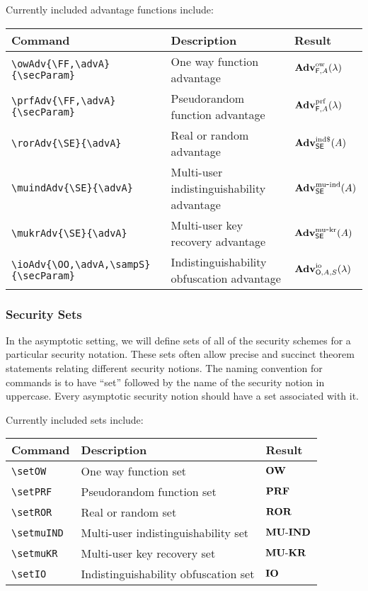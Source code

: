 \documentclass[11pt,twoside]{report}
\begin{document}
Currently included advantage functions include:
\begin{center}
\begin{tabular}{l l l}
	\textbf{Command} & \textbf{Description} & \textbf{Result} \\\hline
	\lstinline$\owAdv{\FF,\advA}{\secParam}$ & One way function advantage & $\mathbf{Adv}^{\rm ow}_{\mathsf{F},A}(\lambda)$  \\
	\lstinline$\prfAdv{\FF,\advA}{\secParam}$ & Pseudorandom function advantage & $\mathbf{Adv}^{\rm prf}_{\mathsf{F},A}(\lambda)$  \\
	\lstinline$\rorAdv{\SE}{\advA}$ & Real or random advantage & $\mathbf{Adv}^{\rm ind\$}_{\mathsf{SE}}(A)$  \\
	\lstinline$\muindAdv{\SE}{\advA}$ & Multi-user indistinguishability advantage & $\mathbf{Adv}^{\rm mu\mbox{-}ind}_{\mathsf{SE}}(A)$  \\
	\lstinline$\mukrAdv{\SE}{\advA}$ & Multi-user key recovery advantage & $\mathbf{Adv}^{\rm mu\mbox{-}kr}_{\mathsf{SE}}(A)$  \\
	\lstinline$\ioAdv{\OO,\advA,\sampS}{\secParam}$ & Indistinguishability obfuscation advantage & $\mathbf{Adv}^{\rm io}_{\mathsf{O},A,S}(\lambda)$
\end{tabular}
\end{center}

\subsubsection{Security Sets}
In the asymptotic setting, we will define sets of all of the security schemes for a particular security notation.
These sets often allow precise and succinct theorem statements relating different security notions.
The naming convention for commands is to have ``set'' followed by the name of the security notion in uppercase.
Every asymptotic security notion should have a set associated with it.

Currently included sets include:
\begin{center}
\begin{tabular}{l l l}
	\textbf{Command} & \textbf{Description} & \textbf{Result} \\\hline
	\lstinline$\setOW$ & One way function set & $\mathbf{OW}$  \\
	\lstinline$\setPRF$ & Pseudorandom function set & $\mathbf{PRF}$  \\
	\lstinline$\setROR$ & Real or random set & $\mathbf{ROR}$  \\
	\lstinline$\setmuIND$ & Multi-user indistinguishability set & $\mathbf{MU\mbox{-}IND}$  \\
	\lstinline$\setmuKR$ & Multi-user key recovery set & $\mathbf{MU\mbox{-}KR}$  \\
	\lstinline$\setIO$ & Indistinguishability obfuscation set & $\mathbf{IO}$
\end{tabular}
\end{center}
\end{document}
